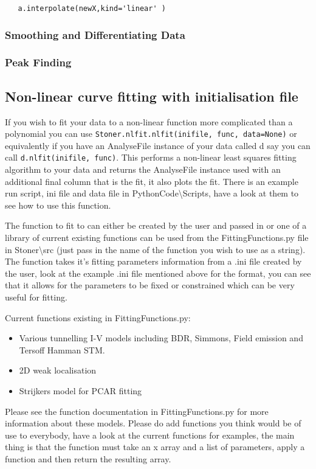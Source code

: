 \documentclass[a4paper,11pt]{scrartcl}
\begin{document}
\begin{lstlisting}
   a.interpolate(newX,kind='linear' )
\end{lstlisting}

\subsubsection{Smoothing and Differentiating Data}

\subsubsection{Peak Finding}

\subsection{Non-linear curve fitting with initialisation file}

If you wish to fit your data to a non-linear function more complicated than a polynomial you can use \verb#Stoner.nlfit.nlfit(inifile, func, data=None)# or equivalently if you have an AnalyseFile instance of your data called d say you can call \verb#d.nlfit(inifile, func)#. This performs a non-linear least squares fitting algorithm to your data and returns the AnalyseFile instance used with an additional final column that is the fit, it also plots the fit. There is an example run script, ini file and data file in PythonCode\textbackslash Scripts, have a look at them to see how to use this function.

The function to fit to can either be created by the user and passed in or one of a library of current existing functions can be used from the FittingFunctions.py file in Stoner\textbackslash src (just pass in the name of the function you wish to use as a string). The function takes it's fitting parameters information from a .ini file created by the user, look at the example .ini file mentioned above for the format, you can see that it allows for the parameters to be fixed or constrained which can be very useful for fitting.

Current functions existing in FittingFunctions.py:
\begin{itemize}
\item Various tunnelling I-V models including BDR, Simmons, Field emission and Tersoff Hamman STM.
\item 2D weak localisation
\item Strijkers model for PCAR fitting
\end{itemize}
Please see the function documentation in FittingFunctions.py for more information about these models. Please do add functions you think would be of use to everybody, have a look at the current functions for examples, the main thing is that the function must take an x array and a list of parameters, apply a function and then return the resulting array.
\end{document}
